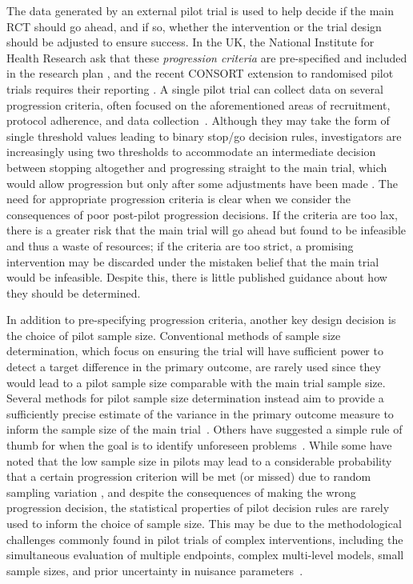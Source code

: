 \documentclass[AMA,STIX1COL]{WileyNJD-v2}
\begin{document}
The data generated by an external pilot trial is used to help decide if the main RCT should go ahead, and if so, whether the intervention or the trial design should be adjusted to ensure success. In the UK, the National Institute for Health Research ask that these \emph{progression criteria} are pre-specified and included in the research plan \cite{NIHR2017}, and the recent CONSORT extension to randomised pilot trials requires their reporting \cite{Eldridge2016a}. A single pilot trial can collect data on several progression criteria, often focused on the aforementioned areas of recruitment, protocol adherence, and data collection~\cite{Avery2017}. Although they may take the form of single threshold values leading to binary stop/go decision rules, investigators are increasingly using two thresholds to accommodate an intermediate decision between stopping altogether and progressing straight to the main trial, which would allow progression but only after some adjustments have been made \cite{Eldridge2016a}. The need for appropriate progression criteria is clear when we consider the consequences of poor post-pilot progression decisions. If the criteria are too lax, there is a greater risk that the main trial will go ahead but found to be infeasible and thus a waste of resources; if the criteria are too strict, a promising intervention may be discarded under the mistaken belief that the main trial would be infeasible. Despite this, there is little published guidance about how they should be determined\cite{Avery2017, Hampson2017}.

In addition to pre-specifying progression criteria, another key design decision is the choice of pilot sample size. Conventional methods of sample size determination, which focus on ensuring the trial will have sufficient power to detect a target difference in the primary outcome, are rarely used since they would lead to a pilot sample size comparable with the main trial sample size. Several methods for pilot sample size determination instead aim to provide a sufficiently precise estimate of the variance in the primary outcome measure to inform the sample size of the main trial~\cite{Browne1995, Julious2005, Sim2012, Teare2014, Eldridge2015, Whitehead2015}. Others have suggested a simple rule of thumb for when the goal is to identify unforeseen problems~\cite{Viechtbauer2015}. While some have noted that the low sample size in pilots may lead to a considerable probability that a certain progression criterion will be met (or missed) due to random sampling variation \cite{Eldridge2015, Cooper2018}, and despite the consequences of making the wrong progression decision, the statistical properties of pilot decision rules are rarely used to inform the choice of sample size. This may be due to the methodological challenges commonly found in  pilot trials of complex interventions, including the simultaneous evaluation of multiple endpoints, complex multi-level models, small sample sizes, and prior uncertainty in nuisance parameters~\cite{Wilson2015}.
\end{document}
